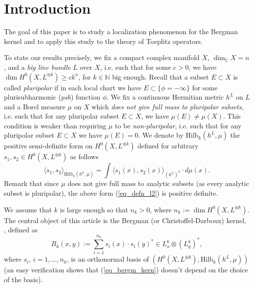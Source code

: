\documentclass[12pt]{article}
\numberwithin{equation}{section}
\theoremstyle{theorem}
\theoremstyle{definition}
\theoremstyle{remark}
\newcommand{\comp}{\mathbb{C}}
\newcommand{\nat}{\mathbb{N}}
\begin{document}
\noindent \hrulefill



\section{Introduction}\label{sect_intro}
	The goal of this paper is to study a localization phenomenon for the Bergman kernel and to apply this study to the theory of Toeplitz operators.
	\par 
	To state our results precisely, we fix a compact complex manifold $X$, $\dim_{\comp} X = n$, and a \textit{big line bundle} $L$ over $X$, i.e. such that for some $c > 0$, we have $\dim H^0(X, L^{\otimes k}) \geq c k^n$, for $k \in \nat$ big enough.  
	Recall that a subset $E \subset X$ is called \textit{pluripolar} if in each local chart we have $E \subset \{\phi = -\infty\}$ for some plurisubharmonic (\textit{psh}) function $\phi$.
	We fix a continuous Hermitian metric $h^L$ on $L$ and a Borel measure $\mu$ on $X$ which \textit{does not give full mass to pluripolar subsets}, i.e. such that for any pluripolar subset $E \subset X$, we have $\mu(E) \neq \mu(X)$.
	This condition is weaker than requiring $\mu$ to be \textit{non-pluripolar}, i.e. such that for any pluripolar subset $E \subset X$ we have $\mu(E) = 0$.
	We denote by ${\textrm{Hilb}}_k(h^L, \mu)$ the positive semi-definite form on $H^0(X, L^{\otimes k})$ defined for arbitrary $s_1, s_2 \in H^0(X, L^{\otimes k})$ as follows
	\begin{equation}\label{eq_defn_l2}
			\langle s_1, s_2 \rangle_{{\textrm{Hilb}}_k(h^L, \mu)} = \int \langle s_1(x), s_2(x) \rangle_{(h^L)^{k}} \cdot d \mu(x).
	\end{equation}
	Remark that since $\mu$ does not give full mass to analytic subsets (as every analytic subset is pluripolar), the above form (\ref{eq_defn_l2}) is positive definite.
	\par 
	We assume that $k$ is large enough so that $n_k > 0$, where $n_k := \dim H^0(X, L^{\otimes k})$.
	The central object of this article is the Bergman (or Christoffel-Darboux) kernel, \cite{Bergman}, defined as
	\begin{equation}\label{eq_bergm_kern}
		B_k(x, y) := \sum_{i = 1}^{n_k} s_i(x) \cdot s_i(y)^*  \in L^k_x \otimes (L^k_y)^*,
	\end{equation}
	where $s_i$, $i = 1, \ldots, n_k$, is an orthonormal basis of $(H^0(X, L^{\otimes k}), {\textrm{Hilb}}_k(h^L, \mu))$ (an easy verification shows that (\ref{eq_bergm_kern}) doesn't depend on the choice of the basis).
\end{document}
